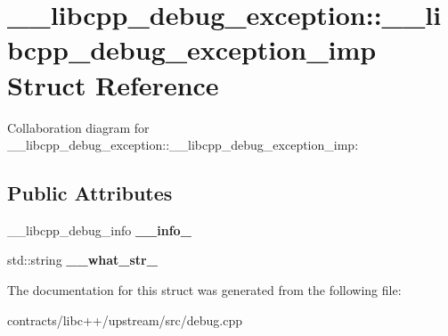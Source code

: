 \hypertarget{struct____libcpp__debug__exception_1_1____libcpp__debug__exception__imp}{}\section{\+\_\+\+\_\+libcpp\+\_\+debug\+\_\+exception\+:\+:\+\_\+\+\_\+libcpp\+\_\+debug\+\_\+exception\+\_\+imp Struct Reference}
\label{struct____libcpp__debug__exception_1_1____libcpp__debug__exception__imp}


Collaboration diagram for \+\_\+\+\_\+libcpp\+\_\+debug\+\_\+exception\+:\+:\+\_\+\+\_\+libcpp\+\_\+debug\+\_\+exception\+\_\+imp\+:
\subsection*{Public Attributes}
\begin{DoxyCompactItemize}
\item 
\mbox{\label{struct____libcpp__debug__exception_1_1____libcpp__debug__exception__imp_a8c83cefed0ec072a11e1c409bfbe6979}} 
\+\_\+\+\_\+libcpp\+\_\+debug\+\_\+info {\bfseries \+\_\+\+\_\+info\+\_\+}
\item 
\mbox{\label{struct____libcpp__debug__exception_1_1____libcpp__debug__exception__imp_a6271b868b278f90d1c16257d351ac7b0}} 
std\+::string {\bfseries \+\_\+\+\_\+what\+\_\+str\+\_\+}
\end{DoxyCompactItemize}


The documentation for this struct was generated from the following file\+:\begin{DoxyCompactItemize}
\item 
contracts/libc++/upstream/src/debug.\+cpp\end{DoxyCompactItemize}
